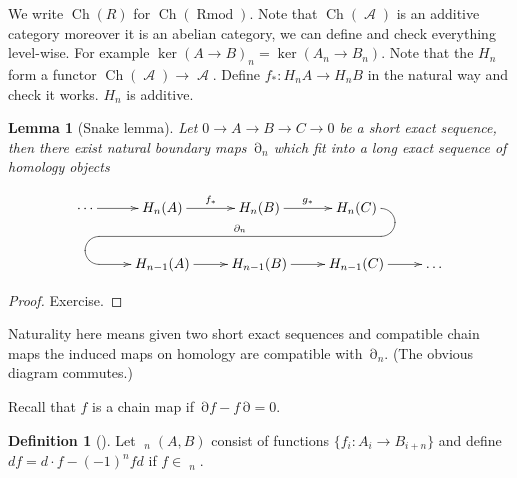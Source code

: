 \documentclass[10pt,]{book}
\theoremstyle{plain}
\newtheorem{lemma}[theorem]{Lemma}
\theoremstyle{definition}
\newtheorem{definition}[theorem]{Definition}
\numberwithin{equation}{section}
\renewenvironment{figure}%
{\begin{mbxfigure}\setcounter{mbxfigure}{\value{theorem}}\stepcounter{theorem}}%
{\end{mbxfigure}}
\DeclareMathOperator{\cHom}{\underline{Hom}}
\DeclareMathOperator{\Ch}{Ch}
\DeclareMathOperator{\Rmod}{R\text{mod}}
\DeclareMathOperator{\cA}{\mathcal{A}}
\DeclareMathOperator{\dd}{\partial}
\begin{document}
          We write \(\Ch(R)\) for \(\Ch(\Rmod)\).
          Note that \(\Ch(\cA)\) is an additive category moreover it is an abelian category, we can define and check everything level-wise.
          For example \(\ker(A\to B)_n = \ker(A_n\to B_n)\).
          Note that the \(H_n\) form a functor \(\Ch(\cA)\to \cA\).
          Define \(f_*\colon H_n A \to H_n B\) in the natural way and check it works.
          \(H_n\) is additive.
\begin{lemma}[Snake lemma]\label{lemma-snake}
Let \(0\to A \to B \to C \to 0\) be a short exact sequence, then there exist natural boundary maps \(\dd_n\) which fit into a long exact sequence of homology objects
            \begin{figure}
\centering
\[
                \xymatrix{ \cdots\ar[r] & H_n(A) \ar[r]^{f_*}&
                H_n(B) \ar[r]^{g_*} & H_n(C)\ar `r[d] `[l]
                `[llld]_{\dd_n} `[dll] [dll]\\
                & H_{n-1}(A) \ar[r] & H_{n-1}(B)
                \ar[r] & H_{n-1}(C)\ar[r] & {\dots} }
              \]\end{figure}
\end{lemma}
\begin{proof}
Exercise.\end{proof}
\par

          Naturality here means given two short exact sequences and compatible chain maps the induced maps on homology are compatible with \(\dd_n\).
          (The obvious diagram commutes.)
\par
Recall that \(f\) is a chain map if \(\dd f - f\dd = 0\).%
\begin{definition}[]\label{definition-10}
Let \(\cHom_n(A,B)\) consist of functions \(\{f_i \colon A_i \to B_{i+n}\} \) and define \(df = d\cdot f - (-1)^n fd\) if \(f\in\cHom_n\).
          \end{definition}
\par
\end{document}
